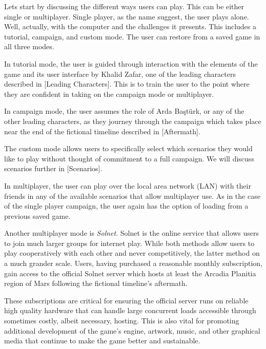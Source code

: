 

Lets start by discussing the different ways users can play. This can be either single or multiplayer. Single player, as the name suggest, the user plays alone. Well, actually, with the computer and the challenges it presents. This includes a tutorial, campaign, and custom mode. The user can restore from a saved game in all three modes.

In tutorial mode, the user is guided through interaction with the elements of the game and its user interface by Khalid Zafar, one of the leading characters described in [Leading Characters]. This is to train the user to the point where they are confident in taking on the campaign mode or multiplayer.

In campaign mode, the user assumes the role of Arda Baştürk, or any of the other leading characters, as they journey through the campaign which takes place near the end of the fictional timeline described in [Aftermath].

The custom mode allows users to specifically select which scenarios they would like to play without thought of commitment to a full campaign. We will discuss scenarios further in [Scenarios]. 

In multiplayer, the user can play over the local area network (LAN) with their friends in any of the available scenarios that allow multiplayer use. As in the case of the single player campaign, the user again has the option of loading from a previous saved game.

Another multiplayer mode is {\it Solnet}. Solnet is the online service that allows users to join much larger groups for internet play. While both methods allow users to play cooperatively with each other and never competitively, the latter method on a much grander scale. Users, having purchased a reasonable monthly subscription, gain access to the official Solnet server which hosts at least the Arcadia Planitia region of Mars following the fictional timeline's aftermath. 

These subscriptions are critical for ensuring the official server runs on reliable high quality hardware that can handle large concurrent loads accessible through sometimes costly, albeit necessary, hosting. This is also vital for promoting additional development of the game's engine, artwork, music, and other graphical media that continue to make the game better and sustainable.

